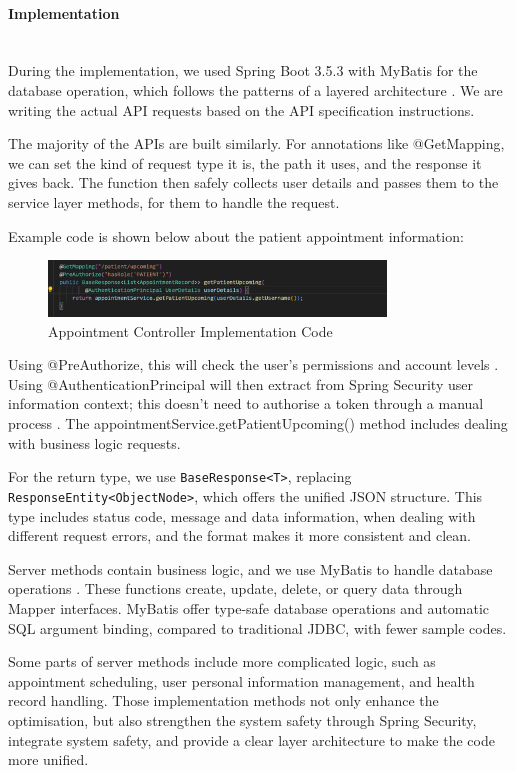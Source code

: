 %
%

\paragraph{Implementation}\mbox{}\\

During the implementation, we used Spring Boot 3.5.3 with MyBatis for the database operation, which follows the patterns of a layered architecture \cite{fowler2002}. We are writing the actual API requests based on the API specification instructions.

The majority of the APIs are built similarly. For annotations like @GetMapping, we can set the kind of request type it is, the path it uses, and the response it gives back. The function then safely collects user details and passes them to the service layer methods, for them to handle the request.

Example code is shown below about the patient appointment information:

\begin{figure}[h]
\centering
\includegraphics[width=0.8\textwidth]{chapters/chapter03/images03/3-3-1-figure(API-I).png}
\caption{Appointment Controller Implementation Code}
\label{fig:appointment-controller}
\end{figure}

Using @PreAuthorize, this will check the user's permissions and account levels \cite{springsecurity2024}. Using @AuthenticationPrincipal will then extract from Spring Security user information context; this doesn't need to authorise a token through a manual process \cite{johnson2023}.
The appointmentService.getPatientUpcoming() method includes dealing with business logic requests.

For the return type, we use \texttt{BaseResponse<T>}, replacing \texttt{ResponseEntity<ObjectNode>}, which offers the unified JSON structure. This type includes status code, message and data information, when dealing with different request errors, and the format makes it more consistent and clean.

Server methods contain business logic, and we use MyBatis to handle database operations \cite{springsecurity2024}. These functions create, update, delete, or query data through Mapper interfaces. MyBatis offer type-safe database operations and automatic SQL argument binding, compared to traditional JDBC, with fewer sample codes.

Some parts of server methods include more complicated logic, such as appointment scheduling, user personal information management, and health record handling. Those implementation methods not only enhance the optimisation, but also strengthen the system safety through Spring Security, integrate system safety, and provide a clear layer architecture to make the code more unified.
